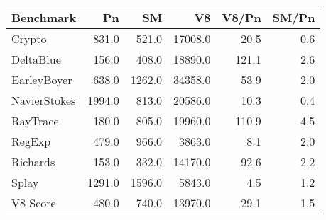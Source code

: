 \begin{tabular}{|l|r|r|r|r|r|}
  \hline
  Benchmark & Pn & SM & V8 & V8/Pn & SM/Pn \\
  \hline \hline
  Crypto & 831.0 & 521.0 & 17008.0 & 20.5 & 0.6\\
  \hline
  DeltaBlue & 156.0 & 408.0 & 18890.0 & 121.1 & 2.6\\
  \hline
  EarleyBoyer & 638.0 & 1262.0 & 34358.0 & 53.9 & 2.0\\
  \hline
  NavierStokes & 1994.0 & 813.0 & 20586.0 & 10.3 & 0.4\\
  \hline
  RayTrace & 180.0 & 805.0 & 19960.0 & 110.9 & 4.5\\
  \hline
  RegExp & 479.0 & 966.0 & 3863.0 & 8.1 & 2.0\\
  \hline
  Richards & 153.0 & 332.0 & 14170.0 & 92.6 & 2.2\\
  \hline
  Splay & 1291.0 & 1596.0 & 5843.0 & 4.5 & 1.2\\
  \hline
  \hline
  V8 Score & 480.0 & 740.0 & 13970.0 & 29.1 & 1.5\\
  \hline
\end{tabular}
